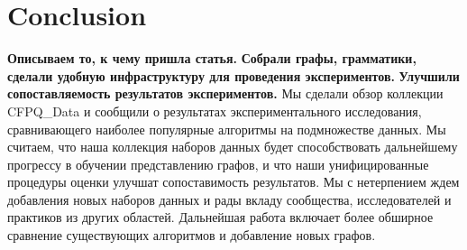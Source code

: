 \section{Conclusion}
\textbf{Описываем то, к чему пришла статья.}
\textbf{Собрали графы, грамматики, сделали удобную инфраструктуру для проведения экспериментов.}
\textbf{Улучшили сопоставляемость результатов экспериментов.}
Мы сделали обзор коллекции CFPQ\_Data и сообщили о результатах экспериментального исследования, сравнивающего наиболее популярные алгоритмы на подмножестве данных. 
Мы считаем, что наша коллекция наборов данных будет способствовать дальнейшему прогрессу в обучении представлению графов, и что наши унифицированные процедуры оценки улучшат сопоставимость результатов. 
Мы с нетерпением ждем добавления новых наборов данных и рады вкладу сообщества, исследователей и практиков из других областей. 
Дальнейшая работа включает более обширное сравнение существующих алгоритмов и добавление новых графов.
